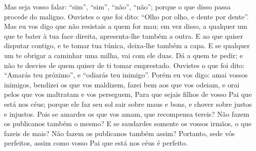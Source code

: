{  Mas seja vosso falar: “sim”, “sim”, “não”, “não”; porque o que disso passa procede do maligno.
  Ouvistes o que foi dito: “Olho por olho, e dente por dente”.
{}
  Mas eu vos digo que não resistais a quem for mau; em vez disso, a qualquer um que te bater à tua face direita, apresenta-lhe também a outra.
  E ao que quiser disputar contigo, e te tomar tua túnica, deixa-lhe também a capa.
  E se qualquer um te obrigar a caminhar uma milha, vai com ele duas.
  Dá a quem te pedir; e não te desvies de quem quiser de ti tomar emprestado.
  Ouvistes o que foi dito: “Amarás teu próximo”, e “odiarás teu inimigo”.
{}
  Porém eu vos digo: amai vossos inimigos, bendizei os que vos maldizem, fazei bem aos que vos odeiam, e orai pelos que vos maltratam e vos perseguem,
  Para que sejais filhos de vosso Pai que está nos céus; porque ele faz seu sol sair sobre maus e bons, e chover sobre justos e injustos.
  Pois se amardes os que vos amam, que recompensa tereis? Não fazem os publicanos também o mesmo?
  E se saudardes somente os vossos irmãos, o que fazeis de mais? Não fazem os publicanos também assim?
  Portanto, sede vós perfeitos, assim como vosso Pai que está nos céus é perfeito.
\par }

